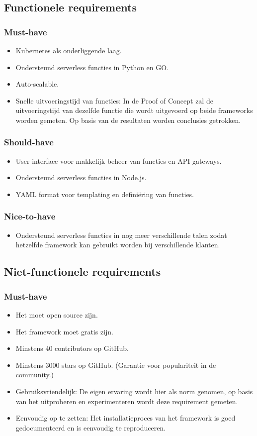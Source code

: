 \subsection{Functionele requirements}
\subsubsection{Must-have}
\begin{itemize}
    \item Kubernetes als onderliggende laag.
    \item Ondersteund serverless functies in Python en GO.
    \item Auto-scalable.
    \item Snelle uitvoeringstijd van functies: In de Proof of Concept zal de uitvoeringstijd van dezelfde functie die wordt uitgevoerd op beide frameworks worden gemeten. Op basis van de resultaten worden conclusies getrokken.
\end{itemize}
\subsubsection{Should-have}
\begin{itemize}
    \item User interface voor makkelijk beheer van functies en API gateways.
    \item Ondersteund serverless functies in Node.js.
    \item YAML format voor templating en definiëring van functies.
\end{itemize}
\subsubsection{Nice-to-have}
\begin{itemize}
    \item Ondersteund serverless functies in nog meer verschillende talen zodat hetzelfde framework kan gebruikt worden bij verschillende klanten.
\end{itemize}
\subsection{Niet-functionele requirements}
\subsubsection{Must-have}
\begin{itemize}
    \item Het moet open source zijn.
    \item Het framework moet gratis zijn.
    \item Minstens 40 contributors op GitHub.
    \item Minstens 3000 stars op GitHub. (Garantie voor populariteit in de community.)
    \item Gebruiksvriendelijk: De eigen ervaring wordt hier als norm genomen, op basis van het uitproberen en experimenteren wordt deze requirement gemeten.
    \item Eenvoudig op te zetten: Het installatieproces van het framework is goed gedocumenteerd en is eenvoudig te reproduceren.
\end{itemize}
